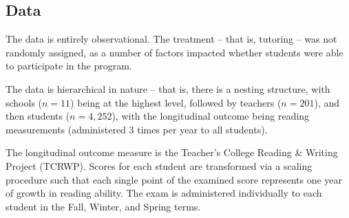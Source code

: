 \documentclass[a0,landscape]{a0poster}
\begin{document}
\begin{multicols}{3}

\subsection*{Data}

The data is entirely observational.
The treatment -- that is, tutoring -- was not randomly assigned,
as a number of factors impacted whether students were able
to participate in the program.

The data is hierarchical in nature -- that is, there is a
nesting structure, with schools ($n=11$) being at the highest level,
followed by teachers ($n=201$), and then students ($n=4,252$),
with the longitudinal outcome being reading measurements
(administered 3 times per year to all students).

The longitudinal outcome measure is the
Teacher's College Reading \& Writing Project (TCRWP).
Scores for each student are transformed via a scaling procedure
such that each single point of the examined score represents
one year of growth in reading ability.
The exam is administered individually to each student
in the Fall, Winter, and Spring terms.


\end{multicols}
\end{document}
